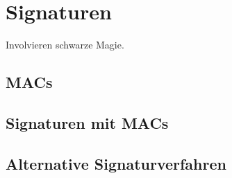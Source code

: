 \author{Autor: Vasilij Schneidermann}
\chapter{Signaturen}

Involvieren schwarze Magie.

\section{\ac{MAC}s}

\section{Signaturen mit \ac{MAC}s}

\section{Alternative Signaturverfahren}
